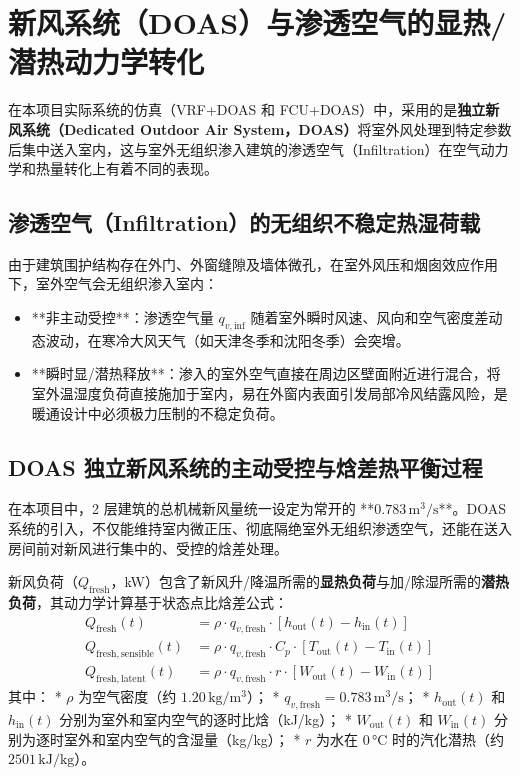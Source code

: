 \documentclass[11pt,a4paper]{article}
\begin{document}
\section{新风系统（DOAS）与渗透空气的显热/潜热动力学转化}

在本项目实际系统的仿真（VRF+DOAS 和 FCU+DOAS）中，采用的是\textbf{独立新风系统（Dedicated Outdoor Air System，DOAS）}将室外风处理到特定参数后集中送入室内，这与室外无组织渗入建筑的渗透空气（Infiltration）在空气动力学和热量转化上有着不同的表现。

\subsection{渗透空气（Infiltration）的无组织不稳定热湿荷载}
由于建筑围护结构存在外门、外窗缝隙及墙体微孔，在室外风压和烟囱效应作用下，室外空气会无组织渗入室内：
\begin{itemize}
    \item **非主动受控**：渗透空气量 $q_{v, \mathrm{inf}}$ 随着室外瞬时风速、风向和空气密度差动态波动，在寒冷大风天气（如天津冬季和沈阳冬季）会突增。
    \item **瞬时显/潜热释放**：渗入的室外空气直接在周边区壁面附近进行混合，将室外温湿度负荷直接施加于室内，易在外窗内表面引发局部冷风结露风险，是暖通设计中必须极力压制的不稳定负荷。
\end{itemize}

\subsection{DOAS 独立新风系统的主动受控与焓差热平衡过程}
在本项目中，2 层建筑的总机械新风量统一设定为常开的 **$0.783\,\mathrm{m^3/s}$**。DOAS 系统的引入，不仅能维持室内微正压、彻底隔绝室外无组织渗透空气，还能在送入房间前对新风进行集中的、受控的焓差处理。

新风负荷（$Q_{\mathrm{fresh}}$，\si{kW}）包含了新风升/降温所需的\textbf{显热负荷}与加/除湿所需的\textbf{潜热负荷}，其动力学计算基于状态点比焓差公式：
\begin{align}
    Q_{\mathrm{fresh}}(t) &= \rho \cdot q_{v, \mathrm{fresh}} \cdot \left[h_{\mathrm{out}}(t) - h_{\mathrm{in}}(t)\right] \\
    Q_{\mathrm{fresh,sensible}}(t) &= \rho \cdot q_{v, \mathrm{fresh}} \cdot C_p \cdot \left[T_{\mathrm{out}}(t) - T_{\mathrm{in}}(t)\right] \\
    Q_{\mathrm{fresh,latent}}(t) &= \rho \cdot q_{v, \mathrm{fresh}} \cdot r \cdot \left[W_{\mathrm{out}}(t) - W_{\mathrm{in}}(t)\right]
\end{align}
其中：
* $\rho$ 为空气密度（约 $1.20\,\mathrm{kg/m^3}$）；
* $q_{v, \mathrm{fresh}} = 0.783\,\mathrm{m^3/s}$；
* $h_{\mathrm{out}}(t)$ 和 $h_{\mathrm{in}}(t)$ 分别为室外和室内空气的逐时比焓（\si{kJ/kg}）；
* $W_{\mathrm{out}}(t)$ 和 $W_{\mathrm{in}}(t)$ 分别为逐时室外和室内空气的含湿量（\si{kg/kg}）；
* $r$ 为水在 $0\,\si{\degreeCelsius}$ 时的汽化潜热（约 $2501\,\mathrm{kJ/kg}$）。
\end{document}
